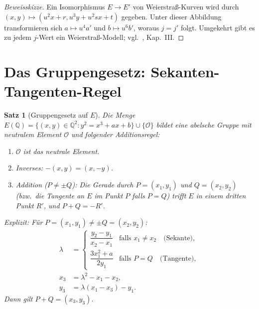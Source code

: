 \documentclass[12pt,a4paper]{amsart}
\newtheorem{theorem}{Satz}[section]
\theoremstyle{definition}
\newcommand{\Q}{\mathbb{Q}}
\begin{document}
\begin{proof}[Beweisskizze]
Ein Isomorphismus $E \to E'$ von Weierstra\ss-Kurven wird durch
$(x,y) \mapsto (u^2 x + r, u^3 y + u^2 sx + t)$ gegeben.
Unter dieser Abbildung transformieren sich $a \mapsto u^4 a'$ und
$b \mapsto u^6 b'$, woraus $j = j'$ folgt.
Umgekehrt gibt es zu jedem $j$-Wert ein Weierstra\ss-Modell; vgl.\ \cite{Silverman1986}, Kap.~III.
\end{proof}

\section{Das Gruppengesetz: Sekanten-Tangenten-Regel}

\begin{theorem}[Gruppengesetz auf $E$]
\label{thm:group_law}
Die Menge $E(\Q) = \{(x,y) \in \Q^2 : y^2 = x^3+ax+b\} \cup \{\mathcal{O}\}$
bildet eine abelsche Gruppe mit neutralem Element $\mathcal{O}$ und
folgender Additionsregel:

\begin{enumerate}
  \item[\textup{(i)}] $\mathcal{O}$ ist das neutrale Element.
  \item[\textup{(ii)}] Inverses: $-(x,y) = (x,-y)$.
  \item[\textup{(iii)}] Addition ($P \ne \pm Q$): Die Gerade durch $P = (x_1,y_1)$
    und $Q = (x_2,y_2)$ (bzw.\ die Tangente an $E$ im Punkt $P$ falls $P=Q$)
    trifft $E$ in einem dritten Punkt $R'$, und $P+Q = -R'$.
\end{enumerate}

Explizit: F\"ur $P = (x_1,y_1) \ne \pm Q = (x_2,y_2)$:
\begin{align}
  \lambda &=
  \begin{cases}
    \dfrac{y_2 - y_1}{x_2 - x_1} & \text{falls } x_1 \ne x_2
      \quad\text{(Sekante)},\\[6pt]
    \dfrac{3x_1^2 + a}{2y_1}     & \text{falls } P = Q
      \quad\text{(Tangente)},
  \end{cases}
  \label{eq:lambda} \\[4pt]
  x_3 &= \lambda^2 - x_1 - x_2, \label{eq:x3} \\
  y_3 &= \lambda(x_1 - x_3) - y_1. \label{eq:y3}
\end{align}
Dann gilt $P + Q = (x_3, y_3)$.
\end{theorem}
\end{document}
